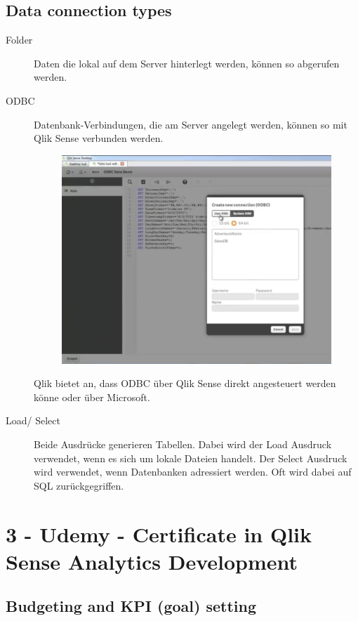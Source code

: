 \subsection{Data connection types}
\begin{description}
	\item[Folder] Daten die lokal auf dem Server hinterlegt werden, können so abgerufen werden.
	\item[\gls{ODBC}] Datenbank-Verbindungen, die am Server angelegt werden, können so mit Qlik Sense verbunden werden.
	\begin{figure}[H]
		\centering
		\includegraphics[scale = 0.3]{attachment/chapter_3/Scc008}
		\caption{}
		\label{fig:Scc008}
	\end{figure}
	Qlik bietet an, dass \gls{ODBC} über Qlik Sense direkt angesteuert werden könne oder über Microsoft. 
	\item[Load/ Select] Beide Ausdrücke generieren Tabellen. Dabei wird der Load Ausdruck verwendet, wenn es sich um lokale Dateien handelt. Der Select Ausdruck wird verwendet, wenn Datenbanken adressiert werden. Oft wird dabei auf SQL zurückgegriffen. 
\end{description}

\section{3 - Udemy - Certificate in Qlik Sense Analytics Development}
\subsection{Budgeting and KPI (goal) setting}
